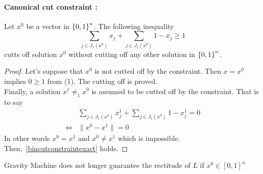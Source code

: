 \paragraph*{Canonical cut constraint :}
\begin{proposition}\label{bincutconstraintexact}
    Let $x^0$ be a vector in $\left\lbrace 0,1 \right\rbrace^n$. The following inequality
    \begin{equation}
        \sum_{j\in J_1(x^0)} x_j + \sum_{j \in J_1(x^0)} 1-x_ j \geq 1
    \end{equation}
    cutts off solution $x^0$ without cutting off any other solution in $\left\lbrace 0,1 \right\rbrace^n$.
\end{proposition}
\begin{proof}
Let's suppose that $x^0$ is not cutted off by the constraint. Then $x = x^0$ implies $0\geq 1$ from (1). The cutting off is proved.
\\Finally, a solution $x^1 \neq_1 x^0$ is assumed to be cutted off by the constraint. That is to say
\begin{align}
    & \sum_{j\in J_1(x^0)} x_j^1 + \sum_{j \in J_1(x^0)} 1-x_ j^1 = 0 \\
    \Longleftrightarrow &   \| x^0 - x^1 \| = 0
\end{align}
In other words $x^0 = x^1$ and $x^0 \neq x^1$ which is impossible. Then,~\ref{bincutconstraintexact} holds.
\end{proof}
\begin{proposition}
    Gravity Machine does not longer guarantee the rectitude of $L$ if $x^0\in \left\lbrack 0,1 \right\rbrack ^n$
\end{proposition}
